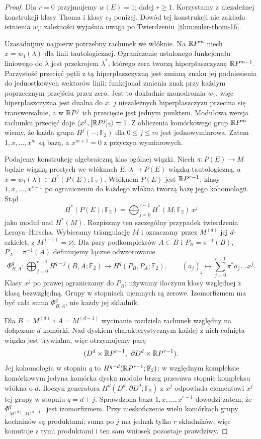 \begin{proof}
Dla $r=0$ przyjmujemy $w(E)=1$; dalej $r\geq1$.
Korzystamy z niezależnej konstrukcji klasy Thoma
i klasy $e_2$ poniżej. Dowód tej konstrukcji nie
zakłada istnienia $w_i$; zależności wyjaśnia uwaga
po Twierdzeniu~\ref{thm:euler-thom-16}.

Uzasadnijmy najpierw potrzebny rachunek we włóknie.
Na $\mathbb{R} P^m$ niech $x=w_1(\lambda)$ dla linii
tautologicznej. Ograniczenie ustalonego funkcjonału
liniowego do $\lambda$ jest przekrojem $\lambda^*$,
którego zera tworzą hiperpłaszczyznę $\mathbb{R} P^{m-1}$.
Parzystość przecięć pętli z tą hiperpłaszczyzną
jest zmianą znaku jej podniesienia do jednostkowych
wektorów linii: funkcjonał zmienia znak przy każdym
poprzecznym przejściu przez zero. Jest to dokładnie
monodromia $w_1$, więc hiperpłaszczyzna jest dualna do $x$.
$j$ niezależnych hiperpłaszczyzn przecina się
transwersalnie, a w $\mathbb{R} P^j$ ich przecięcie jest
jednym punktem. Modułowa wersja rachunku przecięć daje
$\langle x^j,[\mathbb{R} P^j]_2\rangle=1$.
Z obliczenia komórkowego grup $\mathbb{R} P^m$ wiemy, że
każda grupa $H^j(-;\mathbb F_2)$ dla $0\leq j\leq m$
jest jednowymiarowa. Zatem $1,x,\ldots,x^m$ są bazą,
a $x^{m+1}=0$ z przyczyn wymiarowych.

Podajemy konstrukcję algebraiczną klas ogólnej wiązki.
Niech $\pi:P(E)\to M$ będzie wiązką
prostych we włóknach $E$,
$\lambda\to P(E)$ wiązką
tautologiczną, a
$x=w_1(\lambda)\in
H^1(P(E);\mathbb F_2)$.
Włóknem $P(E)$ jest
$\mathbb{R} P^{r-1}$; klasy
$1,x,\ldots,x^{r-1}$
po ograniczeniu do
każdego włókna tworzą
bazę jego kohomologii.
Stąd
\[
 H^*(P(E);\mathbb F_2)
  =\bigoplus_{j=0}^{r-1}
     H^*(M;\mathbb F_2)\,x^j
\]
jako moduł nad $H^*(M)$.
Rozpiszmy ten szczególny przypadek twierdzenia Leraya--Hirscha.
Wybieramy triangulację $M$ i oznaczamy przez $M^{(d)}$ jej
$d$-szkielet, z $M^{(-1)}=\varnothing$. Dla pary podkompleksów
$A\subset B$ i $P_B=\pi^{-1}(B)$, $P_A=\pi^{-1}(A)$ definiujemy
łączne odwzorowanie
\[
 \Phi^q_{B,A}:\bigoplus_{j=0}^{r-1}H^{q-j}(B,A;\mathbb F_2)
 \longrightarrow H^q(P_B,P_A;\mathbb F_2),
 \qquad (a_j)_j\longmapsto\sum_{j=0}^{r-1}\pi^*a_j\smile x^j.
\]
Klasy $x^j$ po prawej ograniczamy do $P_B$; używamy iloczynu
klasy względnej z klasą bezwzględną. Grupy w stopniach ujemnych są zerowe.
Izomorfizmem ma być cała suma $\Phi^q_{B,A}$, nie każdy jej składnik.

Dla $B=M^{(d)}$ i $A=M^{(d-1)}$ wycinanie rozdziela rachunek względny
na dołączane $d$-komórki. Nad dyskiem charakterystycznym każdej
z nich cofnięta wiązka jest trywialna, więc otrzymujemy parę
\[
 (D^d\times\mathbb{R} P^{r-1},\ \partial D^d\times\mathbb{R} P^{r-1}).
\]
Jej kohomologia w stopniu $q$ to $H^{q-d}(\mathbb{R} P^{r-1};\mathbb F_2)$:
w względnym kompleksie komórkowym jedyna komórka dysku modulo
brzeg przesuwa stopnie kompleksu włókna o $d$.
Iloczyn generatora $H^d(D^d,\partial D^d;\mathbb F_2)$ z $x^j$
odpowiada elementowi $x^j$ tej grupy w stopniu $q=d+j$.
Sprawdzona baza $1,x,\ldots,x^{r-1}$ dowodzi zatem, że
$\Phi^q_{M^{(d)},M^{(d-1)}}$ jest izomorfizmem.
Przy nieskończenie wielu komórkach grupy kochainów są produktami;
suma po $j$ ma jednak tylko $r$ składników, więc komutuje z tymi
produktami i ten sam wniosek pozostaje prawdziwy.


\end{proof}

